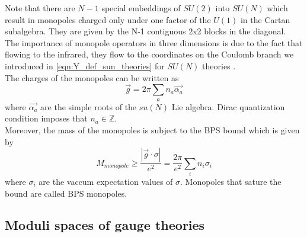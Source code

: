 Note that there are $N-1$ special embeddings of $SU(2)$ into $SU(N)$ which result in monopoles charged only under one factor of the $U(1)$ in the Cartan subalgebra. They are given by the N-1 contiguous 2x2 blocks in the diagonal.\\
The importance of monopole operators in three dimensions is due to the fact that flowing to the infrared, they flow to the coordinates on the Coulomb branch we introduced in \eqref{eqn:Y_def_sun_theories} for $SU(N)$ theories \cite{Aharony:2013dha}.
\\
The charges of the monopoles can be written as
\begin{equation}
\vec{g}  = 2 \pi \sum_a n_a \vec{\alpha_a}
\end{equation}
where $\vec{\alpha_a}$ are the simple roots of the $su(N)$ Lie algebra. Dirac quantization condition imposes that $n_a \in \mathbb{Z}$.\\
Moreover, the mass of the monopoles is subject to the BPS bound which is given by
\begin{equation}
M_{monopole} \geq \frac{| \vec{g} \cdot \sigma| }{e^2} = \frac{2 \pi}{e^2} \sum_i n_i \sigma_i
\end{equation}
where $\sigma_i$ are the vaccum expectation values of $\sigma$.
Monopoles that sature the bound are called BPS monopoles.\\

 























 \subsection{Moduli spaces of gauge theories}

